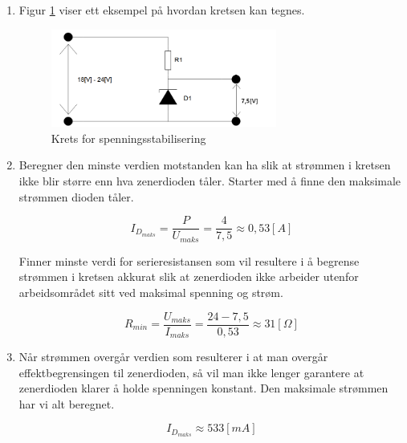 \begin{solution}[name=Løsningsforslag oppgave]
\begin{enumerate}[label=\roman*)]
	\item Figur \ref{fig:zenKrets1} viser ett eksempel på hvordan kretsen kan tegnes.
		\begin{figure}[H]
			\centering
			\includegraphics[width=0.7\textwidth]{diode/figurer/zenKrets1.png}
			\caption{Krets for spenningsstabilisering}
			\label{fig:zenKrets1}
		\end{figure}
	\item Beregner den minste verdien motstanden kan ha slik at strømmen i kretsen ikke blir større enn hva zenerdioden tåler. Starter med å finne den maksimale strømmen dioden tåler.

	\[I_{D_{maks}}=\frac{P}{U_{maks}}=\frac{4}{7,5} \approx 0,53 [A]\]

	Finner minste verdi for serieresistansen som vil resultere i å begrense strømmen i kretsen akkurat slik at zenerdioden ikke arbeider utenfor arbeidsområdet sitt ved maksimal spenning og strøm.

	\[R_{min}= \frac{U_{maks}}{I_{maks}}= \frac{24-7,5}{0,53} \approx 31 [\Omega]\]

	\item Når strømmen overgår verdien som resulterer i at man overgår effektbegrensingen til zenerdioden, så vil man ikke lenger garantere at zenerdioden klarer å holde spenningen konstant. Den maksimale strømmen har vi alt beregnet.

	\[I_{D_{maks}} \approx 533 [mA]\]
\end{enumerate}
\end{solution}


